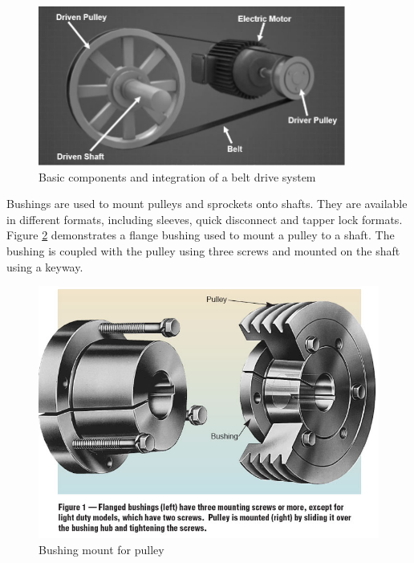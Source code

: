 \begin{figure}[H]
    \centering
    \includegraphics[width=0.9\textwidth]{Sections/LiteratureReview/img/drive/drive_belt2.JPG}
    \caption{Basic components and integration of a belt drive system \cite{convergence_training_belt_nodate}}
    \label{fig:drive_belt2}
\end{figure}

Bushings are used to mount pulleys and sprockets onto shafts. They are available in different formats, including sleeves, quick disconnect and tapper lock formats. Figure \ref{fig:bushing} demonstrates a flange bushing used to mount a pulley to a shaft. The bushing is coupled with the pulley using three screws and mounted on the shaft using a keyway.\cite{machine_design_making_2000}

\begin{figure}[H]
    \centering
    \includegraphics[width=\textwidth]{Sections/LiteratureReview/img/Chasis/Bushing.jpg}
    \caption{Bushing mount for pulley \cite{machine_design_making_2000}}
    \label{fig:bushing}
\end{figure}

